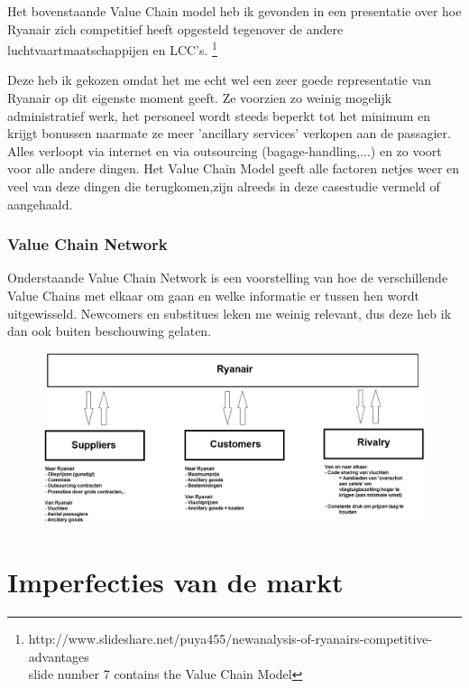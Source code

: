 \documentclass{article}
\begin{document}
Het bovenstaande Value Chain model heb ik gevonden in een presentatie over hoe Ryanair zich competitief heeft opgesteld tegenover de andere luchtvaartmaatschappijen en LCC's. \footnote{http://www.slideshare.net/puya455/newanalysis-of-ryanairs-competitive-advantages \\ slide number 7 contains the Value Chain Model}
\newpage

Deze heb ik gekozen omdat het me echt wel een zeer goede representatie van Ryanair op dit eigenste moment geeft. Ze voorzien zo weinig mogelijk administratief werk, het personeel wordt steeds beperkt tot het minimum en krijgt bonussen naarmate ze meer 'ancillary services' verkopen aan de passagier. Alles verloopt via internet en via outsourcing (bagage-handling,...) en zo voort voor alle andere dingen.
Het Value Chain Model geeft alle factoren netjes weer en veel van deze dingen die terugkomen,zijn alreeds in deze casestudie vermeld of aangehaald.

\section{Value Chain Network}

Onderstaande Value Chain Network is een voorstelling van hoe de verschillende Value Chains met elkaar om gaan en welke informatie er tussen hen wordt uitgewisseld. Newcomers en substitues leken me weinig relevant, dus deze heb ik dan ook buiten beschouwing gelaten.

\begin{figure}[h]
\centering
\includegraphics[scale=0.35]{image5}
\end{figure}

\newpage
\part{Imperfecties van de markt}
\end{document}
